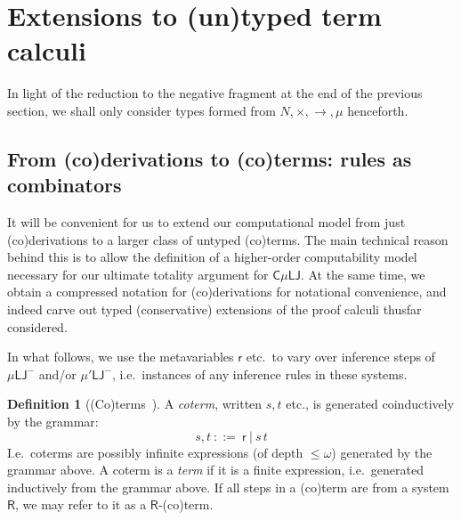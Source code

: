 \documentclass[10pt,a4paper]{amsart}
\theoremstyle{plain}
\theoremstyle{definition}
\newtheorem{definition}[definition]{Definition}
\newcommand{\bnf}{::=}
\newcommand{\anupam}[1]{\todo[color=green]{A: #1}}
\renewcommand{\todo}[1]{}
\renewcommand{\anupam}[1]{}
\theoremstyle{plain}
\theoremstyle{definition} %
\newcommand{\Terms}{\mathrm{Ter}}
\newcommand{\Coterms}{\mathrm{Coter}}
\newcommand{\nat}{\mathit{N}}
\newcommand{\N}{\nat} %
\newcommand{\arrow}{\to}
\newcommand{\infrule}{\mathsf{r}}
\newcommand{\rrule}{\infrule} %
\newcommand{\LJ}{\mathsf{LJ}}
\newcommand{\muLJ}{\mu\LJ}
\newcommand{\muLJnorec}{\mu'\LJ}
\newcommand{\muLJneg}{\muLJ^-}
\newcommand{\muLJnegnorec}{\muLJnorec^-}
\newcommand{\circular}{\mathsf C}
\newcommand{\cmuLJ}{\circular\muLJ}
\begin{document}
\section{Extensions to (un)typed term calculi}
\label{sec:term-calculi}
In light of the reduction to the negative fragment at the end of the previous section, we shall only consider types formed from $\N, \times, \arrow, \mu$ henceforth.


\subsection{From (co)derivations to (co)terms: rules as combinators}
It will be convenient for us to extend our computational model from just (co)derivations to a larger class of untyped (co)terms.
The main technical reason behind this is to allow the definition of a higher-order computability model necessary for our ultimate totality argument for $\cmuLJ$.
At the same time, we obtain a compressed notation for (co)derivations for notational convenience, and indeed carve out typed (conservative) extensions of the proof calculi thusfar considered.

In what follows, we use the metavariables $\rrule $ etc.\ to vary over inference steps of $\muLJneg$ and/or $\muLJnegnorec$, i.e.\ instances of any inference rules in these systems.
\begin{definition}
[(Co)terms~\cite{Das21:CT-fscd}]
 A \emph{coterm}, written $s,t$ etc., is generated coinductively by the grammar:
 \[
 s,t \ \bnf \ \rrule  \ \vert \ s\, t
 \]
I.e.\ coterms are possibly infinite expressions (of depth $\leq \omega$) generated by the grammar above.
A coterm is a \emph{term} if it is a finite expression, i.e.\ generated inductively from the grammar above.
 If all steps in a (co)term are from a system $\mathsf R$, we may refer to it as a $\mathsf R$-(co)term.
% 
\end{definition}
\end{document}
